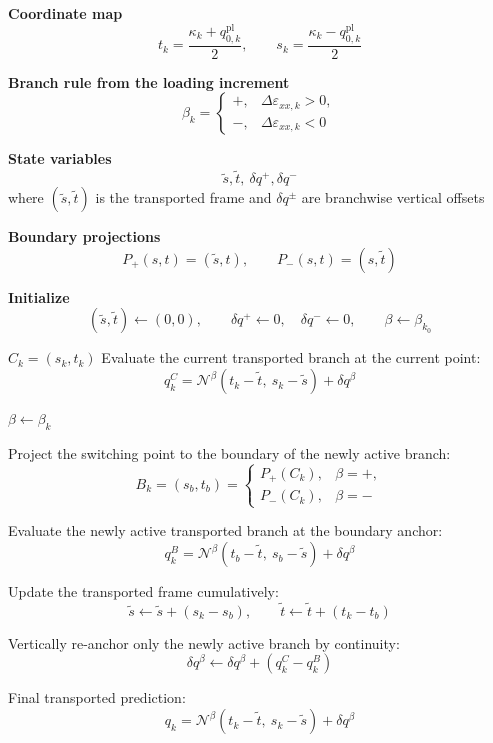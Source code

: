 \documentclass[11pt,a4paper]{article}
\begin{document}
\begin{algorithm}[H]
\caption{Branchwise Projection-Transport in $(s,t)$ Coordinates}
\begin{algorithmic}[1]

\State \textbf{Coordinate map}
\[
t_k=\frac{\kappa_k+q_{0,k}^{\mathrm{pl}}}{2},
\qquad
s_k=\frac{\kappa_k-q_{0,k}^{\mathrm{pl}}}{2}
\]

\State \textbf{Branch rule from the loading increment}
\[
\beta_k=
\begin{cases}
+,& \Delta\varepsilon_{xx,k}>0,\\
-,& \Delta\varepsilon_{xx,k}<0
\end{cases}
\]

\State \textbf{State variables}
\[
\tilde s,\tilde t,\ \delta q^+,\delta q^-
\]
\Statex \hspace{\algorithmicindent} where $(\tilde s,\tilde t)$ is the transported frame and $\delta q^\pm$ are branchwise vertical offsets

\State \textbf{Boundary projections}
\[
P_+(s,t)=(\tilde s,t),\qquad
P_-(s,t)=(s,\tilde t)
\]

\State \textbf{Initialize}
\[
(\tilde s,\tilde t)\gets(0,0),\qquad
\delta q^+\gets0,\quad \delta q^-\gets0,\qquad
\beta\gets\beta_{k_0}
\]

    \State $C_k=(s_k,t_k)$
    \State Evaluate the current transported branch at the current point:
    \[
    q_k^C=\mathcal N^\beta(t_k-\tilde t,\ s_k-\tilde s)+\delta q^\beta
    \]

        \State $\beta\gets\beta_k$

        \State Project the switching point to the boundary of the newly active branch:
        \[
        B_k=(s_b,t_b)=
        \begin{cases}
        P_+(C_k), & \beta=+,\\
        P_-(C_k), & \beta=-
        \end{cases}
        \]

        \State Evaluate the newly active transported branch at the boundary anchor:
        \[
        q_k^B=\mathcal N^\beta(t_b-\tilde t,\ s_b-\tilde s)+\delta q^\beta
        \]

        \State Update the transported frame cumulatively:
        \[
        \tilde s\gets\tilde s+(s_k-s_b),\qquad
        \tilde t\gets\tilde t+(t_k-t_b)
        \]

        \State Vertically re-anchor only the newly active branch by continuity:
        \[
        \delta q^\beta\gets\delta q^\beta+(q_k^C-q_k^B)
        \]
    \EndIf

    \State Final transported prediction:
    \[
    q_k=\mathcal N^\beta(t_k-\tilde t,\ s_k-\tilde s)+\delta q^\beta
    \]
\EndFor

\end{algorithmic}
\end{algorithm}
\end{document}
